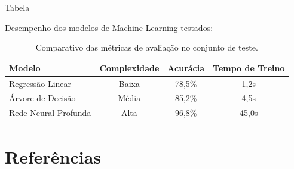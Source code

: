 \documentclass[aspectratio=169]{beamer}
\begin{document}
\begin{frame}{Tabela}

    Desempenho dos modelos de Machine Learning testados\footnotemark:

    \vspace{0.4cm}

    \begin{table}
        \centering
        \begin{tabular}{ l c c c}
            \hline
            \textbf{Modelo} & \textbf{Complexidade} & \textbf{Acurácia} & \textbf{Tempo de Treino} \\ 
            \hline
            Regressão Linear      & Baixa  & 78,5\% & 1,2s  \\
            Árvore de Decisão     & Média  & 85,2\% & 4,5s  \\
            Rede Neural Profunda  & Alta   & 96,8\% & 45,0s \\
            \hline
        \end{tabular}
        \caption{Comparativo das métricas de avaliação no conjunto de teste.}
    \end{table}


\end{frame}


\section{Referências}
\end{document}

